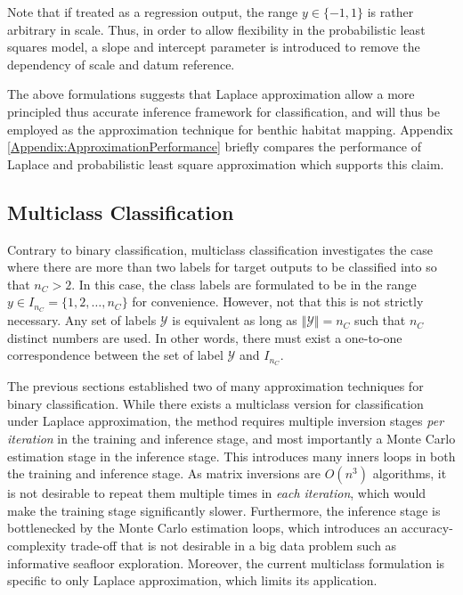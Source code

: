 				Note that if treated as a regression output, the range $y \in \{-1, 1\}$ is rather arbitrary in scale. Thus, in order to allow flexibility in the probabilistic least squares model, a slope and intercept parameter is introduced to remove the dependency of scale and datum reference.
				
				The above formulations suggests that Laplace approximation allow a more principled thus accurate inference framework for classification, and will thus be employed as the approximation technique for benthic habitat mapping. Appendix \ref{Appendix:ApproximationPerformance} briefly compares the performance of Laplace and probabilistic least square approximation which supports this claim.
			
		\subsection{Multiclass Classification}
		\label{BenthicHabitatMapping:Classification:MulticlassClassification}
		
			Contrary to binary classification, multiclass classification investigates the case where there are more than two labels for target outputs to be classified into so that $n_{C} > 2$. In this case, the class labels are formulated to be in the range $y \in I_{n_{C}} = \{1, 2, \dots, n_{C}\}$ for convenience. However, not that this is not strictly necessary. Any set of labels $\mathcal{Y}$ is equivalent as long as $\Vert \mathcal{Y} \Vert = n_{C}$ such that $n_{C}$ distinct numbers are used. In other words, there must exist a one-to-one correspondence between the set of label $\mathcal{Y}$ and $I_{n_{C}}$.
			
			The previous sections established two of many approximation techniques for binary classification. While there exists a multiclass version for classification under Laplace approximation, the method requires multiple inversion stages \textit{per iteration} in the training and inference stage, and most importantly a Monte Carlo estimation stage in the inference stage. This introduces many inners loops in both the training and inference stage. As matrix inversions are $O(n^{3})$ algorithms, it is not desirable to repeat them multiple times in \textit{each iteration}, which would make the training stage significantly slower. Furthermore, the inference stage is bottlenecked by the Monte Carlo estimation loops, which introduces an accuracy-complexity trade-off that is not desirable in a big data problem such as informative seafloor exploration. Moreover, the current multiclass formulation is specific to only Laplace approximation, which limits its application.
			

